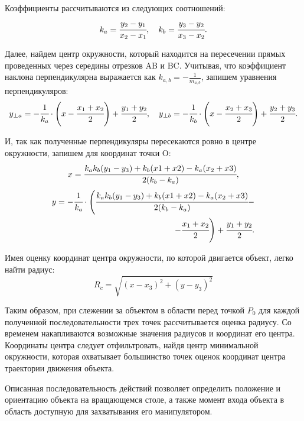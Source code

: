 Коэффициенты рассчитываются из следующих соотношений:
\begin{equation}
	k_a = \cfrac{y_2 - y_1}{x_2 - x_1}, \quad k_b = \cfrac{y_3 - y_2}{x_3 - x_2}.
\end{equation}

Далее, найдем центр окружности, который находится на пересечении прямых проведенных через середины отрезков AB и BC. Учитывая, что коэффициент наклона перпендикулярна выражается как $ k_{a,b} = -\frac{1}{m_{a,b}}  $, запишем уравнения перпендикуляров:
\begin{equation}
	y_{\perp a} = - \cfrac{1}{k_a} \cdot \Bigg( x - \cfrac{x_1 + x_2}{2}\Bigg) + \cfrac{y_1 + y_2}{2}, \quad
	y_{\perp b} = - \cfrac{1}{k_b} \cdot \Bigg( x - \cfrac{x_2 + x_3}{2}\Bigg) + \cfrac{y_2 + y_3}{2}.
\end{equation}

И, так как полученные перпендикуляры пересекаются ровно в центре окружности, запишем для координат точки O:
\begin{gather}
	x = \cfrac{k_a k_b ( y_1 - y_3) + k_b (x1 + x2) - k_a (x_2 + x3)}{2 (k_b - k_a)},
\end{gather}
\begin{align*} 
	y = - \cfrac{1}{k_a} \cdot \Bigg( \cfrac{k_a k_b ( y_1 - y_3) + k_b (x1 + x2) - k_a (x_2 + x3)}{2 (k_b - k_a)} -\\- \cfrac{x_1 + x_2}{2} \Bigg) + \cfrac{y_1 + y_2}{2}.
\end{align*}

Имея оценку координат центра окружности, по которой двигается объект, легко найти радиус:
\begin{equation}
	R_c = \sqrt{(x - x_3)^2 + (y - y_3)^2}
\end{equation}

Таким образом, при слежении за объектом в области перед точкой $ P_0 $ для каждой полученной последовательности трех точек рассчитывается оценка радиусу. Со временем накапливаются возможные значения радиусов и координат его центра. Координаты центра следует отфильтровать, найдя центр минимальной окружности, которая охватывает большинство точек оценок координат центра траектории движения объекта.

Описанная последовательность действий позволяет определить положение и ориентацию объекта на вращающемся столе, а также момент входа объекта в область доступную для захватывания его манипулятором.

